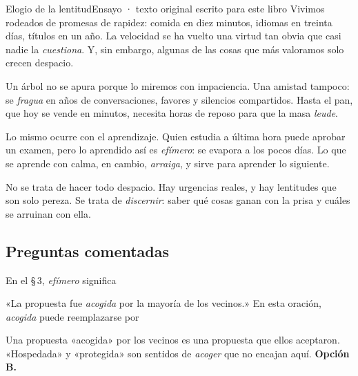 \begin{texto}{Elogio de la lentitud}{Ensayo · texto original escrito para este libro}
\pa Vivimos rodeados de promesas de rapidez: comida en diez minutos, idiomas en treinta días, títulos en un año. La
velocidad se ha vuelto una virtud tan obvia que casi nadie la \emph{cuestiona}. Y, sin embargo, algunas de las cosas que
más valoramos solo crecen despacio.

\pa Un árbol no se apura porque lo miremos con impaciencia. Una amistad tampoco: se \emph{fragua} en años de
conversaciones, favores y silencios compartidos. Hasta el pan, que hoy se vende en minutos, necesita horas de reposo para
que la masa \emph{leude}.

\pa Lo mismo ocurre con el aprendizaje. Quien estudia a última hora puede aprobar un examen, pero lo aprendido así es
\emph{efímero}: se evapora a los pocos días. Lo que se aprende con calma, en cambio, \emph{arraiga}, y sirve para aprender
lo siguiente.

\pa No se trata de hacer todo despacio. Hay urgencias reales, y hay lentitudes que son solo pereza. Se trata de
\emph{discernir}: saber qué cosas ganan con la prisa y cuáles se arruinan con ella.
\end{texto}

\subsection{Preguntas comentadas}
\begin{comentada}{En el \S\,3, \emph{efímero} significa}
\end{comentada}

\begin{reto}
«La propuesta fue \emph{acogida} por la mayoría de los vecinos.» En esta oración, \emph{acogida} puede reemplazarse por
\end{reto}

\begin{retoresuelto}
Una propuesta «acogida» por los vecinos es una propuesta que ellos aceptaron. «Hospedada» y «protegida» son sentidos de
\emph{acoger} que no encajan aquí. \textbf{Opción B.}
\end{retoresuelto}

